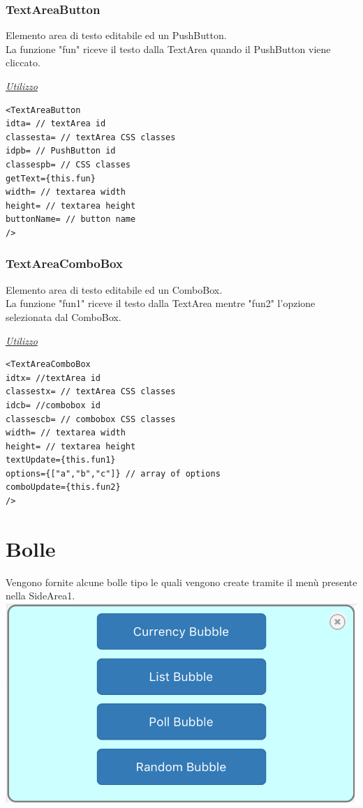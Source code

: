 \subsubsection{TextAreaButton}
Elemento area di testo editabile ed un PushButton.\\
La funzione "fun" riceve il testo dalla TextArea quando il PushButton viene cliccato.
\begin{center}
\underline{\textit{Utilizzo}}
\begin{lstlisting}
<TextAreaButton
idta= // textArea id
classesta= // textArea CSS classes
idpb= // PushButton id
classespb= // CSS classes
getText={this.fun}
width= // textarea width
height= // textarea height
buttonName= // button name
/>
\end{lstlisting}
\end{center}
\newpage
\subsubsection{TextAreaComboBox}
Elemento area di testo editabile ed un ComboBox.\\
La funzione "fun1" riceve il testo dalla TextArea mentre "fun2" l'opzione selezionata dal ComboBox.
\begin{center}
\underline{\textit{Utilizzo}}
\begin{lstlisting}
<TextAreaComboBox
idtx= //textArea id 
classestx= // textArea CSS classes
idcb= //combobox id 
classescb= // combobox CSS classes
width= // textarea width
height= // textarea height
textUpdate={this.fun1}
options={["a","b","c"]} // array of options
comboUpdate={this.fun2}
/>	
\end{lstlisting}
\end{center}

\section{Bolle}
Vengono fornite alcune bolle tipo le quali vengono create tramite il menù presente nella SideArea1.\\

\includegraphics[scale=0.75]{img/menu.png}
\newpage
